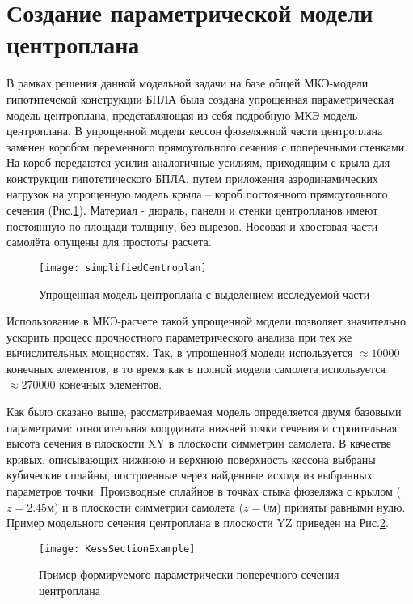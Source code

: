 \section{Создание параметрической модели центроплана}
\label{sec:creationOfModel}

В рамках решения данной модельной задачи на базе общей МКЭ-модели гипотитечской конструкции БПЛА была создана упрощенная параметрическая модель центроплана, представляющая из себя подробную МКЭ-модель центроплана. В упрощенной модели кессон фюзеляжной части центроплана заменен коробом переменного прямоугольного сечения с поперечными стенками. На короб передаются усилия аналогичные усилиям, приходящим с крыла для конструкции гипотетического БПЛА, путем приложения аэродинамических нагрузок на упрощенную модель крыла -- короб постоянного прямоугольного сечения (Рис.\ref{fig:CurvedKessonPatran}). Материал - дюраль, панели и стенки центропланов имеют постоянную по площади толщину, без вырезов. Носовая и хвостовая части самолёта опущены для простоты расчета.  



\begin{figure}[ht]
\centering
\texttt{[image: simplifiedCentroplan]}
\caption{Упрощенная модель центроплана с выделением исследуемой части}
\label{fig:CurvedKessonPatran}
\end{figure}

Использование в МКЭ-расчете такой упрощенной модели позволяет значительно ускорить процесс прочностного параметрического анализа при тех же вычислительных мощностях. Так, в упрощенной модели используется $\approx10000$ конечных элементов, в то время как в полной модели самолета используется $\approx270000$ конечных элементов.

Как было сказано выше, рассматриваемая модель определяется двумя базовыми параметрами: относительная координата нижней точки сечения и строительная высота сечения в плоскости XY в плоскости симметрии самолета. В качестве кривых, описывающих нижнюю и верхнюю поверхность кессона выбраны кубические сплайны, построенные через найденные исходя из выбранных параметров точки. Производные сплайнов в точках стыка фюзеляжа с крылом ($z=2.45\text{м}$) и в плоскости симметрии самолета ($z=0\text{м}$) приняты равными нулю. Пример модельного сечения центроплана в плоскости YZ приведен на Рис.\ref{fig:KessSectionExample}.

\begin{figure}[ht]
\centering
\texttt{[image: KessSectionExample]}
%
\caption{Пример формируемого параметрически поперечного сечения центроплана}
\label{fig:KessSectionExample}
\end{figure}

